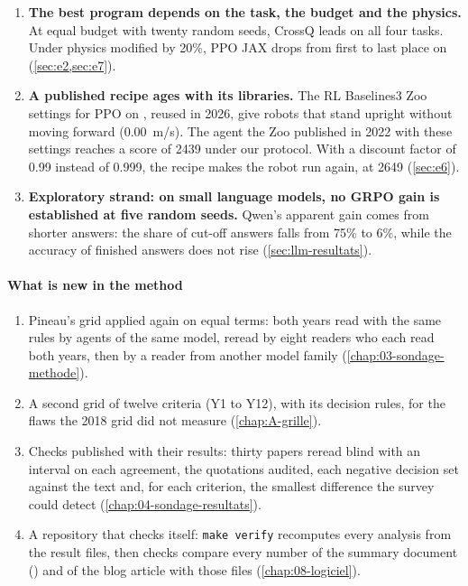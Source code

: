 \begin{enumerate}
  rules out the other ways of computing more than it designates this script (\cref{sec:b1}).
  \item \textbf{The best program depends on the task, the budget and the physics.} At equal budget
  with twenty random seeds, CrossQ leads on all four tasks. Under physics modified by 20\%, PPO JAX
  drops from first to last place on  (\cref{sec:e2,sec:e7}).
  \item \textbf{A published recipe ages with its libraries.} The RL Baselines3 Zoo settings for PPO on
  , reused in 2026, give robots that stand upright without moving forward (0.00~m/s).
  The agent the Zoo published in 2022 with these settings reaches a score of \num{2439} under our
  protocol. With a discount factor of 0.99 instead of 0.999, the recipe makes the robot run again, at
  \num{2649} (\cref{sec:e6}).
  \item \textbf{Exploratory strand: on small language models, no GRPO gain is established at five random seeds.} Qwen's
  apparent gain comes from shorter answers: the share of cut-off answers falls from 75\% to 6\%, while
  the accuracy of finished answers does not rise (\cref{sec:llm-resultats}).
\end{enumerate}

\paragraph{What is new in the method}
\begin{enumerate}
  \item Pineau's grid applied again on equal terms: both years read with the same rules by agents
  of the same model, reread by eight readers who each read both years, then by a reader from another
  model family (\cref{chap:03-sondage-methode}).
  \item A second grid of twelve criteria (Y1 to Y12), with its decision rules, for the
  flaws the 2018 grid did not measure (\cref{chap:A-grille}).
  \item Checks published with their results: thirty papers reread blind with an interval on each
  agreement, the quotations audited, each negative decision set against the text and, for each
  criterion, the smallest difference the survey could detect (\cref{chap:04-sondage-resultats}).
  \item A repository that checks itself: \texttt{make verify} recomputes every analysis from the
  result files, then checks compare every number of the summary document
  () and of the blog article with those files (\cref{chap:08-logiciel}).
\end{enumerate}

